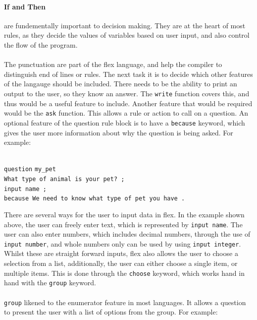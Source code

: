 \documentclass[12pt]{report}
\begin{document}
\paragraph{If and Then} are fundementally important to decision making.  They are at the heart of most rules, as they decide the values of variables based on user input, and also control the flow of the program.\\
\\
The punctuation are part of the flex language, and help the compiler to distinguish end of lines or rules.
The next task it is to decide which other features of the langauge should be included.  There needs to be the ability to print an output to the user, so they know an answer.  The \texttt{write} function covers this, and thus would be a useful feature to include.  Another feature that would be required would be the \texttt{ask} function.  This allows a rule or action to call on a question.  An optional feature of the question rule block is to have a \texttt{because} keyword, which gives the user more information about why the question is being asked.  For example:\\
\\
\begin{tabbing}
\texttt{question} \= \texttt{my\_pet}\\
\> \texttt{What type of animal is your pet? ;}\\
\> \texttt{input name ;}\\
\> \texttt{because We need to know what type of pet you have .}\\
\end{tabbing}
There are several ways for the user to input data in flex.  In the example shown above, the user can freely enter text, which is represented by \texttt{input name}.  The user can also enter numbers, which includes decimal numbers, through the use of \texttt{input number}, and whole numbers only can be used by using \texttt{input integer}.  Whilst these are straight forward inputs, flex also allows the user to choose a selection from a list, additionally, the user can either choose a single item, or multiple items.  This is done through the \texttt{choose} keyword, which works hand in hand with the \texttt{group} keyword.\\
\\
\texttt{group} likened to the enumerator feature in most languages.  It allows a question to present the user with a list of options from the group.  For example:\\
\\
\end{document}
